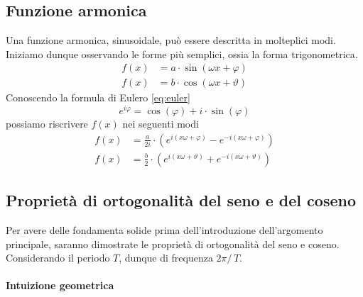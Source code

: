 \subsection{Funzione armonica}
Una funzione armonica, sinusoidale, pu\`o essere descritta in molteplici modi.
Iniziamo dunque osservando le forme pi\`u semplici, ossia la forma
trigonometrica.
\begin{align} \label{eq:harmonics-trig}
    f(x) &= a\cdot\sin (\omega x + \varphi) \\
    f(x) &= b\cdot\cos(\omega x + \vartheta)
\end{align}
Conoscendo la formula di Eulero \eqref{eq:euler}
\begin{equation} \label{eq:euler}
    e^{i\varphi} = \cos(\varphi) + i\cdot\sin(\varphi)
\end{equation}
possiamo riscrivere \(f(x)\) nei seguenti modi
\begin{align} \label{eq:harmonics-complex}
    f(x) &= \frac{a}{2i}\cdot(e^{i(x\omega + \varphi)} - e^{-i(x\omega + \varphi)}) \\
    f(x) &= \frac{b}{2}\cdot(e^{i(x\omega + \vartheta)} + e^{-i(x\omega + \vartheta)})
\end{align}

\subsection{Propriet\`a di ortogonalit\`a del seno e del coseno}
Per avere delle fondamenta solide prima dell'introduzione dell'argomento
principale, saranno dimostrate le propriet\`a di ortogonalit\`a del seno e
coseno. Considerando il periodo \(T\), dunque di frequenza \(2\pi /\,T\).

\paragraph{Intuizione geometrica}

